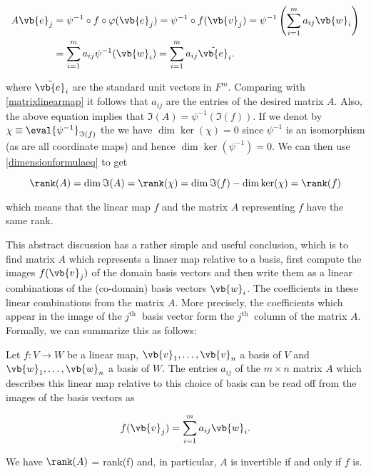 \documentclass[a4paper,12pt]{report}
\begin{document}
\begin{equation}  
    \begin{aligned}
    A\vb{e} _{j} &= \psi ^{-1} \circ f \circ \varphi (\vb{e} _{j} ) =\psi ^{-1} \circ f(\vb{v} _{j} ) = \psi ^{-1} \left( \sum_{i=1}^{m} a_{ij}\vb{w} _{i}   \right) \\ &= \sum_{i=1}^{m} a_{ij} \psi ^{-1} (\vb{w} _{i} ) = \sum_{i=1}^{m} a_{ij}\tilde{\vb{e} }_{i}.     
    \end{aligned}
\end{equation}

where \(\tilde{\vb{e} }_{i}  \) are the standard unit vectors in \(F^{m} \). Comparing with \cref{matrixlinearmap} it follows that \(a_{ij} \) are the entries of the desired matrix \(A\). Also, the above equation implies that \(\Im (A) = \psi ^{-1} (\Im (f))\). If we denot by \(\chi \equiv \eval{\psi  ^{-1}}_{\Im (f)}^{}  \) the we have \(\dim \ker (\chi ) = 0\) since \(\psi ^{-1} \) is an isomorphism (as are all coordinate maps) and hence \(\dim \ker (\psi ^{-1} ) = 0\). We can then use \cref{dimensionformulaeq} to get

\begin{equation}
    \rank (A) = \dim \Im (A) = \rank (\chi ) = \dim \Im (f) - \dim \ker (\chi ) = \rank (f)
\end{equation}

which means that the linear map \(f\) and the matrix \(A\) representing \(f\) have the same rank.


This abstract discussion has a rather simple and useful conclusion, which is to find matrix \(A\) which represents a linaer map relative to a basis, first compute the images \(f(\vb{v} _{j} ) \) of the domain basis vectors and then write them as a linear combinations of the (co-domain) basis vectors \(\vb{w} _{i} \). The coefficients in these linear combinations from the matrix \(A\). More precisely, the coefficients which appear in the image of the \(j^{\text{th }} \) basis vector form the \(j^{\text{th }} \) column of the matrix \(A\). Formally, we can summarize this as follows:

\begin{lemma}
Let \(f:V \rightarrow W\) be a linear map, \(\vb{v}_{1}, \ldots, \vb{v}_n \) a basis of \(V\) and \(\vb{w}_{1}, \ldots, \vb{w}_n \) a basis of \(W\). The entries \(a_{ij} \) of the \(m \times n\) matrix \(A\) which describes this linear map relative to this choice of basis can be read off from the images of the basis vectors as 

\begin{equation}
    f(\vb{v} _{j} ) = \sum_{i=1}^{m} a_{ij}\vb{w} _{i} . 
\end{equation}

We have \(\rank (A)\) = rank(f) and, in particular, \(A\) is invertible if and only if \(f\) is.  

\end{lemma}
\end{document}
